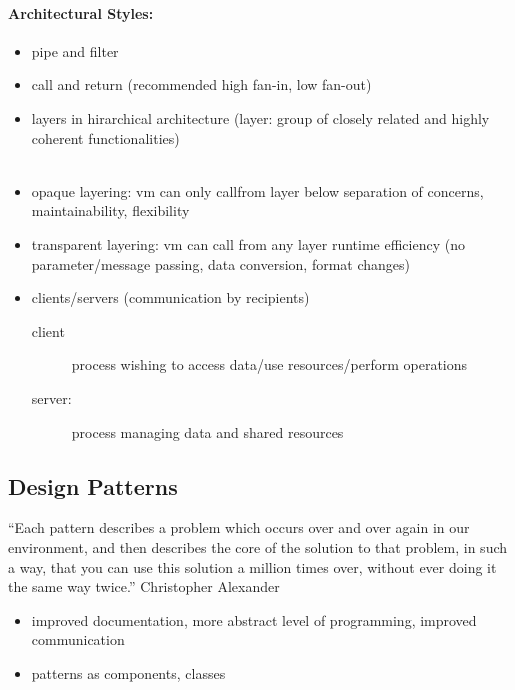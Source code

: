 \documentclass[a4paper, 10pt]{article}
\begin{document}
\paragraph{Architectural Styles:}
\begin{itemize}
	\item pipe and filter \\ 
	\item call and return (recommended high fan-in, low fan-out) \\ 
	\item layers in hirarchical architecture (layer: group of closely related and highly coherent functionalities) \\  \\ 
	\item opaque layering: vm can only callfrom layer below \follows separation of concerns, maintainability, flexibility
	\item transparent layering: vm can call from any layer \follows runtime efficiency (no parameter/message passing, data conversion, format changes)
	\item clients/servers (communication by recipients)
	\begin{description}
		\item[client] process wishing to access data/use resources/perform operations
		\item[server:] process managing data and shared resources
	\end{description}
\end{itemize}
\subsection{Design Patterns}
\begin{shaded}
``Each pattern describes a problem which occurs over and over again in our environment, and then describes the core of the solution to that problem, in such a way, that you can use this solution a million times over, without ever doing it the same way twice.'' Christopher Alexander
\end{shaded}
\begin{itemize}
	\item improved documentation, more abstract level of programming, improved communication
	\item patterns as components, classes
\end{itemize}
\end{document}
